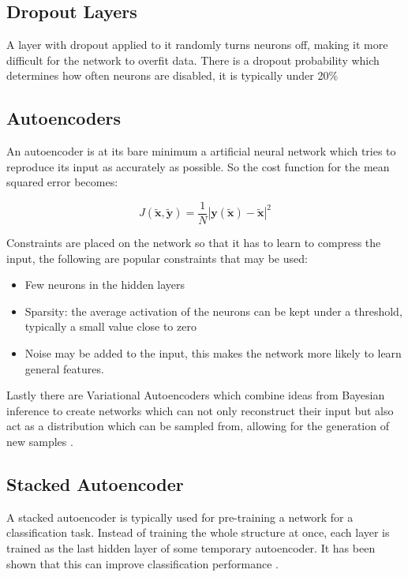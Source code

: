 \subsection{Dropout Layers}
A layer with dropout applied to it randomly turns neurons off, making it more
difficult for the network to overfit data. There is a dropout probability
which determines how often neurons are disabled, it is typically under 20\%
\subsection{Autoencoders}
An autoencoder is at its bare minimum a artificial neural network which tries
to reproduce its input as accurately as possible. So the cost function for the mean squared error becomes:

\begin{equation} \label{eq:autoencoder_cost}
    J(\tilde{\mathbf{x}},\tilde{\mathbf{y}}) = \frac{1}{N}\left |\mathbf{y}(\tilde{\mathbf{x}})-\tilde{\mathbf{x}}\right | ^2
\end{equation}

Constraints are
placed on the network so that it has to learn to compress the input, the following
are popular constraints that may be used:
\begin{itemize}
    \item Few neurons in the hidden layers
    \item Sparsity: the average activation of the neurons can be kept under a
    threshold, typically a small value close to zero \cite{autong}
    \item Noise may be added to the input, this makes the network more likely
    to learn general features.
\end{itemize}
Lastly there are Variational Autoencoders which combine ideas from Bayesian inference
to create networks which can not only reconstruct their input but also act as a
distribution which can be sampled from, allowing for the generation of new samples \cite{Kingma2013}.

\subsection{Stacked Autoencoder}

A stacked autoencoder is typically used for pre-training a network for a classification task.
Instead of training the whole structure at once, each layer is trained as the last hidden
layer of some temporary autoencoder. It has been shown that this can improve classification performance \cite{stacks}.


